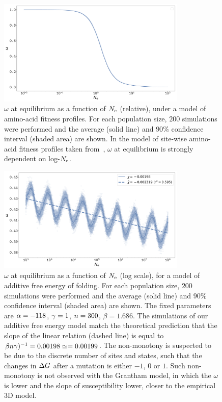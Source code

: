 \documentclass{article}
\begin{document}
\begin{figure}[H]
    \centering
    \includegraphics[width=0.8\textwidth] {SimuProfile-Elasticity.pdf}
    \caption[$\omega$ susceptibility with amino-acid fitness profiles]{
    $\omega$ at equilibrium as a function of $N_{\text{e}}$ (relative), under a model of amino-acid fitness profiles.
    For each population size, $200$ simulations were performed and the average (solid line) and $90\%$ confidence interval (shaded area) are shown.
    In the model of site-wise amino-acid fitness profiles taken from~\citep{Bloom2017}, $\omega$ at equilibrium is strongly dependent on log-$N_{\text{e}}$.
    }
\end{figure}

\begin{figure}[H]
    \centering
    \includegraphics[width=0.8\textwidth] {SimuStab-Elasticity.pdf}
    \caption[$\omega$ susceptibility with additive free energy of folding]{
    $\omega$ at equilibrium as a function of $N_{\text{e}}$ (log scale), for a model of additive free energy of folding.
    For each population size, $200$ simulations were performed and the average (solid line) and $90\%$ confidence interval (shaded area) are shown.
    The fixed parameters are $\alpha=-118$, $\gamma=1$, $n=300$, $\beta=1.686$.
    The simulations of our additive free energy model match the theoretical prediction that the slope of the linear relation (dashed line) is equal to $\beta n \gamma)^{-1} = 0.00198 \simeq = 0.00199$.
    The non-monotony is suspected to be due to the discrete number of sites and states, such that the changes in $\Delta G$ after a mutation is either $-1$, $0$ or $1$. Such non-monotony is not observed with the Grantham model, in which the $\omega$ is lower and the slope of susceptibility lower, closer to the empirical 3D model.
    }
\end{figure}
\end{document}
